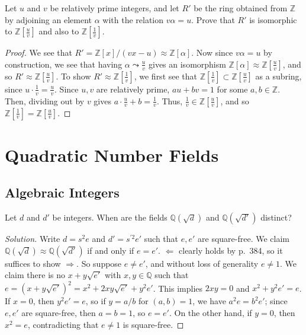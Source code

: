 \documentclass[12pt]{article}
\theoremstyle{remark}
\begin{document}
\begin{problem}
  Let $u$ and $v$ be relatively prime integers, and let $R'$ be the ring obtained from $\mathbb{Z}$ by adjoining an element $\alpha$ with the relation $v\alpha = u$. Prove that $R'$ is isomorphic to $\mathbb{Z}\left[\frac{u}{v}\right]$ and also to $\mathbb{Z}\left[\frac{1}{v}\right]$.
\end{problem}
\begin{proof}
  We see that $R' = \mathbb{Z}[x]/(vx - u) \approx \mathbb{Z}[\alpha]$. Now since $v\alpha = u$ by construction, we see that having $\alpha \leadsto \frac{u}{v}$ gives an isomorphism $\mathbb{Z}[\alpha] \approx \mathbb{Z}\left[\frac{u}{v}\right]$, and so $R' \approx \mathbb{Z}\left[\frac{u}{v}\right]$. To show $R' \approx \mathbb{Z}\left[\frac{1}{v}\right]$, we first see that $\mathbb{Z}\left[\frac{1}{v}\right] \subset \mathbb{Z}\left[\frac{u}{v}\right]$ as a subring, since $u \cdot \frac{1}{v} = \frac{u}{v}$. Since $u,v$ are relatively prime, $au + bv = 1$ for some $a,b \in \mathbb{Z}$. Then, dividing out by $v$ gives $a \cdot \frac{u}{v} + b = \frac{1}{v}$. Thus, $\frac{1}{v} \in \mathbb{Z}\left[\frac{u}{v}\right]$, and so $\mathbb{Z}\left[\frac{1}{v}\right] = \mathbb{Z}\left[\frac{u}{v}\right]$.
\end{proof}
\endgroup

\section{Quadratic Number Fields}
\subsection{Algebraic Integers}
\setcounter{subsubsection}{3}
\begin{problem}
  Let $d$ and $d'$ be integers. When are the fields $\mathbb{Q}(\sqrt{d})$ and $\mathbb{Q}(\sqrt{d'})$ distinct?
\end{problem}
\begin{proof}[Solution]
  Write $d = s^2e$ and $d' = s^{\prime2}e'$ such that $e,e'$ are square-free. We claim $\mathbb{Q}(\sqrt{d}) \approx \mathbb{Q}(\sqrt{d'})$ if and only if $e=e'$. $\Leftarrow$ clearly holds by p.~384, so it suffices to show $\Rightarrow$. So suppose $e \ne e'$, and without loss of generality $e \ne 1$. We claim there is no $x+y\sqrt{e'}$ with $x,y \in \mathbb{Q}$ such that $e = (x+y\sqrt{e'})^2 = x^2 + 2xy\sqrt{e'} + y^2e'$. This implies $2xy = 0$ and $x^2 + y^2e' = e$. If $x = 0$, then $y^2e' = e$, so if $y = a/b$ for $(a,b)=1$, we have $a^2e = b^2e'$; since $e,e'$ are square-free, then $a=b=1$, so $e = e'$. On the other hand, if $y = 0$, then $x^2 = e$, contradicting that $e \ne 1$ is square-free.
\end{proof}
\end{document}
